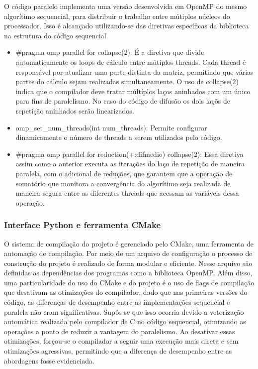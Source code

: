\documentclass[12pt]{article}
\begin{document}
O código paralelo implementa uma versão desenvolvida em OpenMP do mesmo algorítimo sequencial, para distribuir o trabalho entre mútiplos núcleos do processador. Isso é alcançado utilizando-se das diretivas específicas da biblioteca na estrutura do código sequencial.

\begin{itemize}
    \item \#pragma omp parallel for collapse(2): É a diretiva que divide automaticamente os loops de cálculo entre mútiplos threads. Cada thread é responsável por atualizar uma parte distinta da matriz, permitindo que várias partes do cálculo sejam realizadas simultaneamente. O uso de collapse(2) indica que o compilador deve tratar múltíplos laços aninhados com um único para fins de paralelismo. No caso do código de difusão os dois laçõs de repetição aninhados serão linearizados.
    \item omp\_set\_num\_threads(int num\_threads): Permite configurar dinamicamente o número de threads a serem utilizados pelo código.
    \item \#pragma omp parallel for reduction(+:difmedio) collapse(2): Essa diretiva assim como a anterior executa as iterações do laço de repetição de maneira paralela, com o adicional de reduções, que garantem que a operação de somatório que monitora a convergência do algorítimo seja realizada de maneira segura entre as diferentes threads que acessam as variáveis dessa operação.
\end{itemize}

\subsubsection{Interface Python e ferramenta CMake}

O sistema de compilação do projeto é gerenciado pelo CMake, uma ferramenta de automação de compilação. Por meio de um arquivo de configuração o processo de construção do projeto é realizado de forma modular e eficiente. Nesse arquivo são definidas as dependências dos programas como a biblioteca OpenMP. Além disso, uma particularidade do uso do CMake e do projeto é o uso de flags de compilação que desativam as otimizações do compilador, dado que nas primeiras versões do código, as diferenças de desempenho entre as implementações sequencial e paralela não eram significativas. Supôs-se que isso ocorria devido a vetorização automática realizada pelo compilador de C no código sequencial, otimizando as operações a ponto de reduzir a vantagem do paralelismo. Ao desativar essas otimizações, forçou-se o compilador a seguir uma execução mais direta e sem otimizações agressivas, permitindo que a diferença de desempenho entre as abordagens fosse evidenciada.
\end{document}
